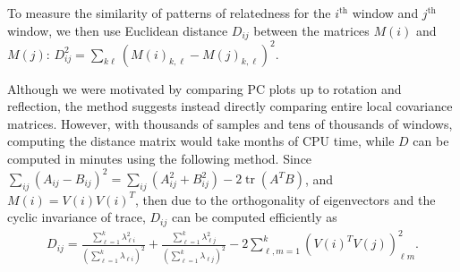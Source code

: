 \documentclass[11pt, oneside]{article}   	%
\DeclareMathOperator{\tr}{tr}
\begin{document}
To measure the similarity of patterns of relatedness for the $i^\text{th}$ window and $j^\text{th}$ window,
we then use
Euclidean distance $D_{ij}$ between the matrices $M(i)$ and $M(j)$:
$D_{ij}^2 = \sum_{k\ell} ( M(i)_{k,\ell} - M(j)_{k,\ell} )^2$.


Although we were motivated by comparing PC plots up to rotation and reflection,
the method suggests instead directly comparing entire local covariance matrices. 
However, with thousands of samples and tens of thousands of windows,
computing the distance matrix would take months of CPU time,
while $D$ can be computed in minutes using the following method.
Since 
$\sum_{ij} (A_{ij}-B_{ij})^2 = \sum_{ij} (A^2_{ij} + B^2_{ij}) - 2 \tr(A^T B)$,
and $M(i) = V(i) V(i)^T$,
then due to the orthogonality of eigenvectors and the cyclic invariance of trace,
$D_{ij}$ can be computed efficiently as
\begin{align}
    D_{ij} 
    = 
    \frac{ \sum_{\ell=1}^k \lambda_{\ell i}^2 }{ (\sum_{\ell=1}^k \lambda_{\ell i})^2 }
    + \frac{ \sum_{\ell=1}^k \lambda_{\ell j}^2 }{ (\sum_{\ell=1}^k \lambda_{\ell j})^2 }
    - 2 \sum_{\ell, m=1}^k (V(i)^T V(j))^2_{\ell m} .
\end{align}
\end{document}

